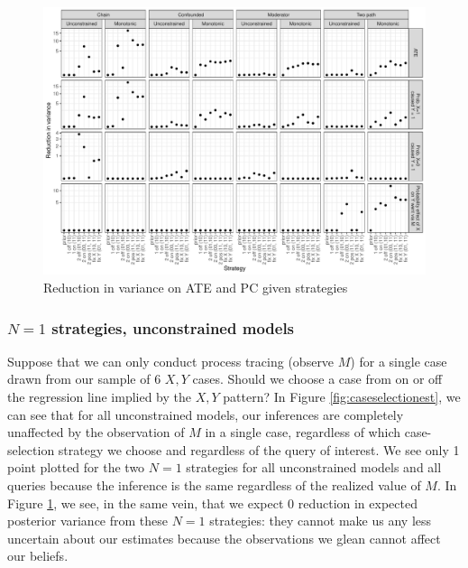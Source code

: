 \documentclass[
  12pt,
]{book}
\begin{document}
\begin{figure}
\centering
\includegraphics{ii_files/figure-latex/caseselectionvar-1.pdf}
\caption{\label{fig:caseselectionvar}Reduction in variance on ATE and PC given strategies}
\end{figure}

\hypertarget{n1-strategies-unconstrained-models}{%
\subsubsection{\texorpdfstring{\(N=1\) strategies, unconstrained models}{N=1 strategies, unconstrained models}}\label{n1-strategies-unconstrained-models}}

Suppose that we can only conduct process tracing (observe \(M\)) for a single case drawn from our sample of 6 \(X,Y\) cases. Should we choose a case from on or off the regression line implied by the \(X,Y\) pattern? In Figure \ref{fig:caseselectionest}, we can see that for all unconstrained models, our inferences are completely unaffected by the observation of \(M\) in a single case, regardless of which case-selection strategy we choose and regardless of the query of interest. We see only 1 point plotted for the two \(N=1\) strategies for all unconstrained models and all queries because the inference is the same regardless of the realized value of \(M\). In Figure \ref{fig:caseselectionvar}, we see, in the same vein, that we expect 0 reduction in expected posterior variance from these \(N=1\) strategies: they cannot make us any less uncertain about our estimates because the observations we glean cannot affect our beliefs.
\end{document}
